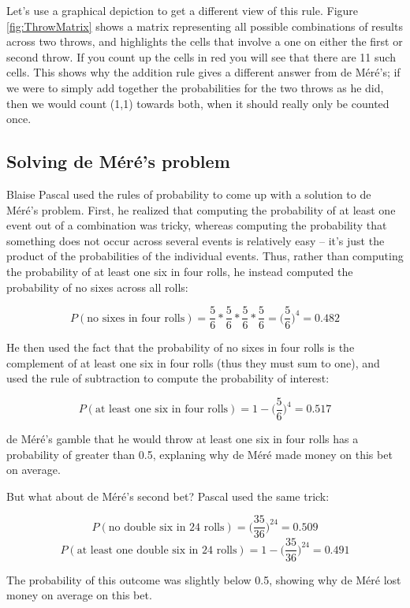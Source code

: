 \documentclass[12pt,]{book}
\theoremstyle{definition}
\theoremstyle{definition}
\theoremstyle{definition}
\theoremstyle{remark}
\begin{document}
Let's use a graphical depiction to get a different view of this rule. Figure \ref{fig:ThrowMatrix} shows a matrix representing all possible combinations of results across two throws, and highlights the cells that involve a one on either the first or second throw. If you count up the cells in red you will see that there are 11 such cells. This shows why the addition rule gives a different answer from de Méré's; if we were to simply add together the probabilities for the two throws as he did, then we would count (1,1) towards both, when it should really only be counted once.

\hypertarget{solving-de-muxe9ruxe9s-problem}{%
\subsection{Solving de Méré's problem}\label{solving-de-muxe9ruxe9s-problem}}

Blaise Pascal used the rules of probability to come up with a solution to de Méré's problem. First, he realized that computing the probability of at least one event out of a combination was tricky, whereas computing the probability that something does not occur across several events is relatively easy -- it's just the product of the probabilities of the individual events. Thus, rather than computing the probability of at least one six in four rolls, he instead computed the probability of no sixes across all rolls:

\[
P(\text{no sixes in four rolls}) = \frac{5}{6}*\frac{5}{6}*\frac{5}{6}*\frac{5}{6}=\bigg(\frac{5}{6}\bigg)^4=0.482
\]

He then used the fact that the probability of no sixes in four rolls is the complement of at least one six in four rolls (thus they must sum to one), and used the rule of subtraction to compute the probability of interest:

\[
P(\text{at least one six in four rolls}) = 1 - \bigg(\frac{5}{6}\bigg)^4=0.517
\]

de Méré's gamble that he would throw at least one six in four rolls has a probability of greater than 0.5, explaning why de Méré made money on this bet on average.

But what about de Méré's second bet? Pascal used the same trick:

\[
P(\text{no double six in 24 rolls}) = \bigg(\frac{35}{36}\bigg)^{24}=0.509
\]
\[
P(\text{at least one double six in 24 rolls}) = 1 - \bigg(\frac{35}{36}\bigg)^{24}=0.491
\]

The probability of this outcome was slightly below 0.5, showing why de Méré lost money on average on this bet.
\end{document}
